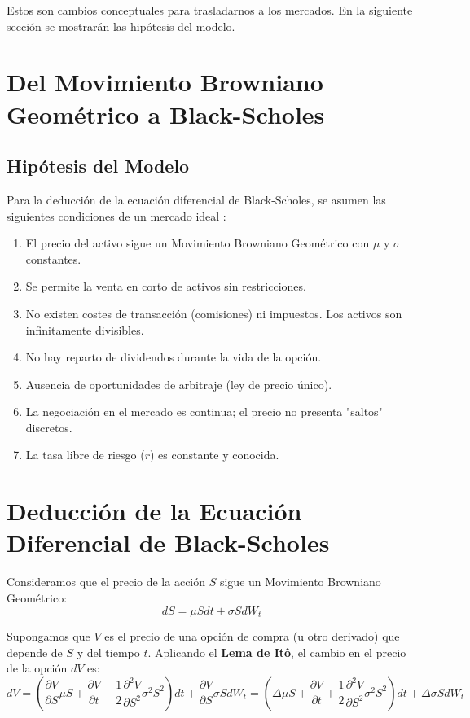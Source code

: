\documentclass[11pt]{article}
\begin{document}
		Estos son cambios conceptuales para trasladarnos a los mercados. En la siguiente sección se mostrarán las hipótesis del modelo.
	\section{Del Movimiento Browniano Geométrico a Black-Scholes}
		\subsection{Hipótesis del Modelo}
			Para la deducción de la ecuación diferencial de Black-Scholes, se asumen las siguientes condiciones de un mercado ideal \cite{hull2016options}:
			\begin{enumerate}
				\item El precio del activo sigue un Movimiento Browniano Geométrico con $\mu$ y $\sigma$ constantes.
				\item Se permite la venta en corto de activos sin restricciones.
				\item No existen costes de transacción (comisiones) ni impuestos. Los activos son infinitamente divisibles.
				\item No hay reparto de dividendos durante la vida de la opción.
				\item Ausencia de oportunidades de arbitraje (ley de precio único).
				\item La negociación en el mercado es continua; el precio no presenta "saltos" discretos.
				\item La tasa libre de riesgo ($r$) es constante y conocida.
			\end{enumerate}
			
	\section{Deducción de la Ecuación Diferencial de Black-Scholes}
	
		Consideramos que el precio de la acción $S$ sigue un Movimiento Browniano Geométrico:
		\begin{equation}
			dS = \mu S dt + \sigma S dW_t
			\label{d S}
		\end{equation}
		
		Supongamos que $V$ es el precio de una opción de compra (u otro derivado) que depende de $S$ y del tiempo $t$. Aplicando el \textbf{Lema de Itô}, el cambio en el precio de la opción $dV$ es:
		\begin{equation}
		dV = \left( \frac{\partial V}{\partial S} \mu S + \frac{\partial V}{\partial t} + \frac{1}{2} \frac{\partial^2 V}{\partial S^2} \sigma^2 S^2 \right) dt + \frac{\partial V}{\partial S} \sigma S dW_t = \left( \Delta\mu S + \frac{\partial V}{\partial t} + \frac{1}{2} \frac{\partial^2 V}{\partial S^2} \sigma^2 S^2 \right) dt + \Delta \sigma S dW_t
		\label{d V}
		\end{equation}
		
\end{document}
